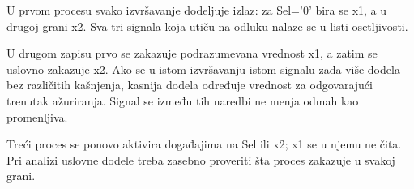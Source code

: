U prvom procesu svako izvršavanje dodeljuje izlaz: za Sel='0' bira se x1, a u drugoj grani x2. Sva tri signala koja utiču na odluku nalaze se u listi osetljivosti.

U drugom zapisu prvo se zakazuje podrazumevana vrednost x1, a zatim se uslovno zakazuje x2. Ako se u istom izvršavanju istom signalu zada više dodela bez različitih kašnjenja, kasnija dodela određuje vrednost za odgovarajući trenutak ažuriranja. Signal se između tih naredbi ne menja odmah kao promenljiva.

Treći proces se ponovo aktivira događajima na Sel ili x2; x1 se u njemu ne čita. Pri analizi uslovne dodele treba zasebno proveriti šta proces zakazuje u svakoj grani.
